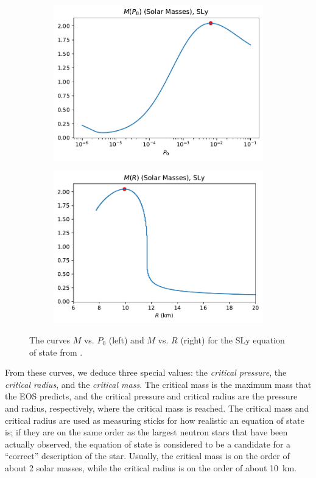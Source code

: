 \begin{figure}[h!]
    \centering
    \begin{subfigure}{.5\textwidth}
        \includegraphics[width=\textwidth]{images/tov/p0_analysis,SLy.pdf}
    \end{subfigure}%
    \begin{subfigure}{.5\textwidth}
        \includegraphics[width=\textwidth]{images/tov/r_analysis,SLy.pdf}
    \end{subfigure}
    \caption{The curves $M$ vs. $P_0$ (left) and $M$ vs. $R$ (right) for the SLy equation of state from \autocite{SLy_2004}.}
    \label{fig: tov, SLy mac curves}
\end{figure}

From these curves, we deduce three special values: the \textit{critical pressure}, the \textit{critical radius}, and the \textit{critical mass}. The critical mass is the maximum mass that the EOS predicts, and the critical pressure and critical radius are the pressure and radius, respectively, where the critical mass is reached. The critical mass and critical radius are used as measuring sticks for how realistic an equation of state is; if they are on the same order as the largest neutron stars that have been actually observed, the equation of state is considered to be a candidate for a ``correct'' description of the star. Usually, the critical mass is on the order of about 2 solar masses, while the critical radius is on the order of about \SI{10}{km}.

